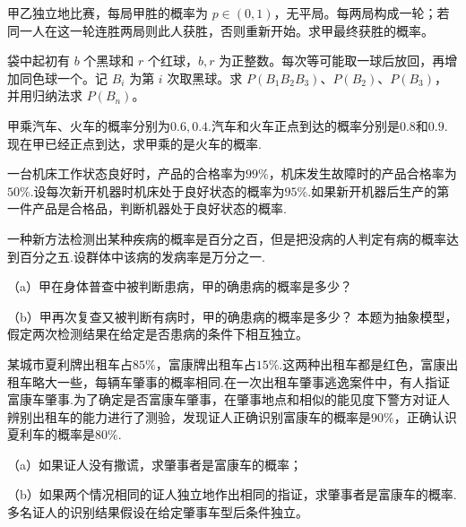 \begin{exercise}[比分差达到二的比赛]\label{q:Y2.19}
甲乙独立地比赛，每局甲胜的概率为 $p\in(0,1)$，无平局。每两局构成一轮；若同一人在这一轮连胜两局则此人获胜，否则重新开始。求甲最终获胜的概率。\par{}\end{exercise}

\begin{exercise}[加强抽样的波利亚球袋]\label{q:Y2.20}
袋中起初有 $b$ 个黑球和 $r$ 个红球，$b,r$ 为正整数。每次等可能取一球后放回，再增加同色球一个。记 $B_i$ 为第 $i$ 次取黑球。求 $P(B_1B_2B_3)$、$P(B_2)$、$P(B_3)$，并用归纳法求 $P(B_n)$。\par{}\end{exercise}

\begin{exercise}[已知正点反推交通方式]\label{q:Y2.21}
甲乘汽车、火车的概率分别为$0.6,0.4$.汽车和火车正点到达的概率分别是$0.8$和$0.9$.现在甲已经正点到达，求甲乘的是火车的概率.\par{}\end{exercise}

\begin{exercise}[观察合格品后的状态]\label{q:Y2.22}
一台机床工作状态良好时，产品的合格率为$99\%$，机床发生故障时的产品合格率为$50\%$.设每次新开机器时机床处于良好状态的概率为$95\%$.如果新开机器后生产的第一件产品是合格品，判断机器处于良好状态的概率.\par{}\end{exercise}

\begin{exercise}[低先验概率下的连续检测]\label{q:Y2.23}
一种新方法检测出某种疾病的概率是百分之百，但是把没病的人判定有病的概率达到百分之五.设群体中该病的发病率是万分之一.

（a）甲在身体普查中被判断患病，甲的确患病的概率是多少？

（b）甲再次复查又被判断有病时，甲的确患病的概率是多少？ 本题为抽象模型，假定两次检测结果在给定是否患病的条件下相互独立。\par{}\end{exercise}

\begin{exercise}[目击证据与先验比例]\label{q:Y2.25}
某城市夏利牌出租车占$85\%$，富康牌出租车占$15\%$.这两种出租车都是红色，富康出租车略大一些，每辆车肇事的概率相同.在一次出租车肇事逃逸案件中，有人指证富康车肇事.为了确定是否富康车肇事，在肇事地点和相似的能见度下警方对证人辨别出租车的能力进行了测验，发现证人正确识别富康车的概率是$90\%$，正确认识夏利车的概率是$80\%$.

（a）如果证人没有撒谎，求肇事者是富康车的概率；

（b）如果两个情况相同的证人独立地作出相同的指证，求肇事者是富康车的概率. 多名证人的识别结果假设在给定肇事车型后条件独立。\par{}\end{exercise}

